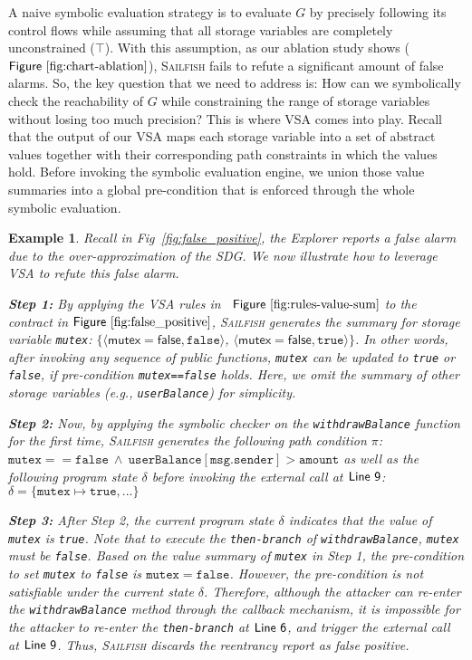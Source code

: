 \documentclass[conference, romanappendices]{tex/IEEEtran}
\theoremstyle{bfnote}
\newcommand{\toolname}{\textsc{Sailfish}\xspace}
\newcommand{\explorer}{{\sc Explorer}\xspace}
\newcommand{\reentrancy}{{reentrancy}\xspace}
\newcommand{\eg}{\textit{e.g.}}
\newcommand{\Line}[1]{\ensuremath{\sf Line~ #1}}
\newcommand{\Fig}[1]{\ensuremath{\sf Figure~\ref{#1}}}
\newcommand{\valEnv}{\delta}
\newcommand{\pathEnv}{\pi}
\newtheorem{example}{Example}
\begin{document}
A naive symbolic evaluation strategy is to evaluate $G$ by precisely following its control flows while assuming that all storage variables are completely unconstrained ($\top$).
With this assumption, as our ablation study shows (\Fig{fig:chart-ablation}), \toolname fails to refute a significant amount of false alarms.
So, the key question that we need to address is: How can we symbolically check the reachability of $G$ while constraining the range of storage variables without losing too much precision?
This is where VSA comes into play.
Recall that the output of our VSA maps each storage variable into a set of abstract values together with their corresponding path constraints in which the values hold. Before invoking the symbolic evaluation engine, we union those value summaries into a global pre-condition that is enforced through the whole symbolic evaluation. 
\vspace{-2mm}
\begin{example}
Recall in Fig~\ref{fig:false_positive}, the \explorer reports a false alarm due to the over-approximation of the SDG.
We now illustrate how to leverage VSA to refute this false alarm.

\noindent
\textbf{Step 1:} By applying the VSA rules in ~\Fig{fig:rules-value-sum} to the contract in \Fig{fig:false_positive}, \toolname generates the summary for storage variable \texttt{mutex}: $\{\langle \mathsf{mutex=false}, \mathtt{false} \rangle$, $\langle \mathsf{mutex=false}, \mathtt{true} \rangle\}$.
In other words, after invoking any sequence of public functions, \texttt{mutex} can be updated to \texttt{true} or \texttt{false}, if pre-condition \texttt{mutex==false} holds.
Here, we omit the summary of other storage variables (\eg, \texttt{userBalance}) for simplicity.

\noindent
\textbf{Step 2:} Now, by applying the symbolic checker 
on the \texttt{withdrawBalance} function for the first time, \toolname generates the following path condition $\pathEnv$: $\mathtt{mutex == false} \  \land \ \mathtt{ userBalance[msg.sender] } > \mathtt{ amount}$
as well as the following program state $\valEnv$ before invoking the external call at \Line{9}: $\valEnv=\{\mathtt{mutex}\mapsto \mathtt{true},...\}$

\noindent
\textbf{Step 3:} After Step 2, the current program state $\valEnv$ indicates that the value of \texttt{mutex} is \texttt{true}.
Note that to execute the \texttt{then-branch} of \texttt{withdrawBalance}, \texttt{mutex} must be \texttt{false}.
Based on the value summary of \texttt{mutex} in Step 1, the pre-condition to set \texttt{mutex} to \texttt{false} is $\mathtt{mutex}=\mathtt{false}$.
However, the pre-condition is \textit{not} satisfiable under the current state $\delta$.
Therefore, although the attacker can re-enter the \texttt{withdrawBalance} method through the callback mechanism, it is impossible for the attacker to re-enter the \texttt{then-branch} at \Line{6}, and trigger the external call at \Line{9}.
Thus, \toolname discards the \reentrancy report as false positive.


\end{example}
\end{document}
